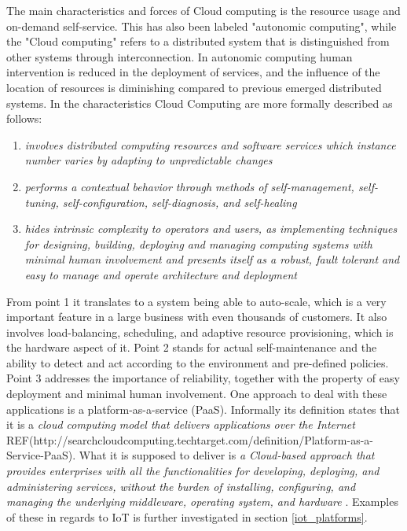The main characteristics and forces of Cloud computing is the resource usage and on-demand self-service. This has also been labeled "autonomic computing", while the "Cloud computing" refers to a distributed system that is distinguished from other systems through interconnection. In autonomic computing human intervention is reduced in the deployment of services, and the influence of the location of resources is diminishing compared to previous emerged distributed systems. In \cite[p. 4-5]{books:cloud-computing} the characteristics Cloud Computing are more formally described as follows:

\begin{enumerate}
	\item \textit{involves distributed computing resources and software services which instance number varies by adapting to unpredictable changes}
	\item \textit{performs a contextual behavior through methods of self-management, self-tuning, self-configuration, self-diagnosis, and self-healing}
	\item \textit{hides intrinsic complexity to operators and users, as implementing techniques for designing, building, deploying and managing computing systems with minimal human involvement and presents itself as a robust, fault tolerant and easy to manage and operate architecture and deployment}
\end{enumerate}

From point 1 it translates to a system being able to auto-scale, which is a very important feature in a large business with even thousands of customers. It also involves load-balancing, scheduling, and adaptive resource provisioning, which is the hardware aspect of it. Point 2 stands for actual self-maintenance and the ability to detect and act according to the environment and pre-defined policies. Point 3 addresses the importance of reliability, together with the property of easy deployment and minimal human involvement. One approach to deal with these applications is a platform-as-a-service (PaaS). Informally its definition states that it is a \textit{cloud computing model that delivers applications over the Internet} REF(http://searchcloudcomputing.techtarget.com/definition/Platform-as-a-Service-PaaS). What it is supposed to deliver is \textit{a Cloud-based approach that provides enterprises with all the functionalities for developing, deploying, and administering services, without the burden of installing, configuring, and managing the underlying middleware, operating system, and hardware} \cite[p. 9]{books:cloud-computing}. Examples of these in regards to IoT is further investigated in section \ref{iot_platforms}. 

